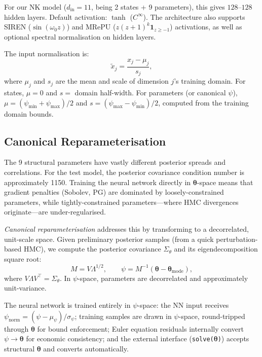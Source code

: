 \documentclass[11pt,a4paper]{article}
\theoremstyle{definition}
\newcommand{\btheta}{\boldsymbol{\theta}}
\newcommand{\code}[1]{\texttt{\color{codecolor}#1}}
\begin{document}
	For our NK model ($d_{\mathrm{in}} = 11$, being 2 states + 9 parameters), this gives $128$--$128$ hidden layers.
	Default activation: $\tanh$ ($C^\infty$).
	The architecture also supports SIREN ($\sin(\omega_0 z)$) and MRePU ($z(z+1)^k \mathbf{1}_{z \geq -1}$) activations, as well as optional spectral normalisation on hidden layers.
	
	The input normalisation is:
	\begin{equation}\label{eq:input_norm}
		\tilde{x}_j = \frac{x_j - \mu_j}{s_j},
	\end{equation}
	where $\mu_j$ and $s_j$ are the mean and scale of dimension $j$'s training domain.
	For states, $\mu = 0$ and $s = $ domain half-width.
	For parameters (or canonical $\psi$), $\mu = (\psi_{\min} + \psi_{\max})/2$ and $s = (\psi_{\max} - \psi_{\min})/2$, computed from the training domain bounds.
	
	\subsection{Canonical Reparameterisation}
	\label{sec:reparam}
	
	The 9 structural parameters have vastly different posterior spreads and correlations.
	For the test model, the posterior covariance condition number is approximately 1150.
	Training the neural network directly in $\btheta$-space means that gradient penalties (Sobolev, PG) are dominated by loosely-constrained parameters, while tightly-constrained parameters---where HMC divergences originate---are under-regularised.
	
	\emph{Canonical reparameterisation} addresses this by transforming to a decorrelated, unit-scale space.
	Given preliminary posterior samples (from a quick perturbation-based HMC), we compute the posterior covariance $\Sigma_\theta$ and its eigendecomposition square root:
	\begin{equation}\label{eq:reparam_def}
		M = V \Lambda^{1/2}, \qquad \psi = M^{-1}(\btheta - \btheta_{\mathrm{mode}}),
	\end{equation}
	where $V \Lambda V^\top = \Sigma_\theta$.
	In $\psi$-space, parameters are decorrelated and approximately unit-variance.
	
	The neural network is trained entirely in $\psi$-space:
	the NN input receives $\psi_{\mathrm{norm}} = (\psi - \mu_\psi) / \sigma_\psi$;
	training samples are drawn in $\psi$-space, round-tripped through $\btheta$ for bound enforcement;
	Euler equation residuals internally convert $\psi \to \btheta$ for economic consistency;
	and the external interface (\code{solve($\btheta$)}) accepts structural $\btheta$ and converts automatically.
	
\end{document}
